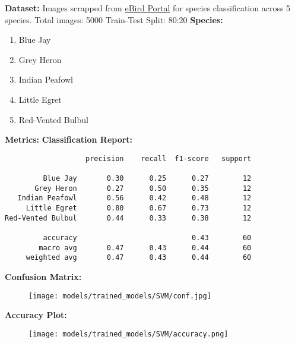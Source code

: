 \documentclass{article}
\begin{document}
\noindent \textbf{Dataset:}
Images scrapped from \href{https://ebird.org/explore}{eBird Portal}  for species classification across 5 species.
\newline
Total images: 5000
\newline
Train-Test Split: 80:20
\newline
\newline
\noindent \textbf{Species:}
\begin{enumerate}[noitemsep]
  \item Blue Jay
  \item Grey Heron
  \item Indian Peafowl
  \item Little Egret
  \item Red-Vented Bulbul
\end{enumerate}
\vspace{5mm}
\noindent \textbf{Metrics:}
\newline
\newline
\noindent \textbf{Classification Report:}

\begin{verbatim}                   precision    recall  f1-score   support

         Blue Jay       0.30      0.25      0.27        12
       Grey Heron       0.27      0.50      0.35        12
   Indian Peafowl       0.56      0.42      0.48        12
     Little Egret       0.80      0.67      0.73        12
Red-Vented Bulbul       0.44      0.33      0.38        12

         accuracy                           0.43        60
        macro avg       0.47      0.43      0.44        60
     weighted avg       0.47      0.43      0.44        60
\end{verbatim}
\newpage
\noindent \textbf{Confusion Matrix:}

\begin{figure}[h!]
\centering
\texttt{[image: models/trained\_models/SVM/conf.jpg]}
\end{figure}
\noindent \textbf{Accuracy Plot:}
\begin{figure}[h!]
\centering
\texttt{[image: models/trained\_models/SVM/accuracy.png]}
\end{figure}
\end{document}
